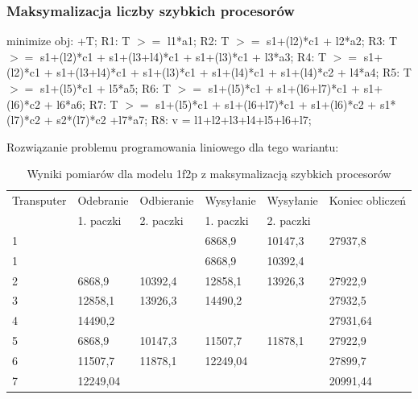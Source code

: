 \documentclass[a4paper,11pt, titlepage]{article}
\begin{document}
\subsubsection{Maksymalizacja liczby szybkich procesorów}
\begin{flushleft}

minimize obj: +T;\linebreak
\linebreak
R1: T $>=$ l1*a1;\linebreak
R2: T $>=$ s1+(l2)*c1 + l2*a2;\linebreak
R3: T $>=$ s1+(l2)*c1 + s1+(l3+l4)*c1 + s1+(l3)*c1 + l3*a3;\linebreak
R4: T $>=$ s1+(l2)*c1 + s1+(l3+l4)*c1 + s1+(l3)*c1 + s1+(l4)*c1 + s1+(l4)*c2 + l4*a4;\linebreak
R5: T $>=$ s1+(l5)*c1 + l5*a5;\linebreak
R6: T $>=$ s1+(l5)*c1 + s1+(l6+l7)*c1 + s1+(l6)*c2 + l6*a6;\linebreak
R7: T $>=$ s1+(l5)*c1 + s1+(l6+l7)*c1 + s1+(l6)*c2 + s1*(l7)*c2 + s2*(l7)*c2 +l7*a7;\linebreak
R8: v = l1+l2+l3+l4+l5+l6+l7;\linebreak
\end{flushleft}

Rozwiązanie problemu programowania liniowego dla tego wariantu:
\begin{table}[hp!]
\begin{tabular}{|l|l|l|l|l|l|}\hline
Transputer&Odebranie&Odbieranie&Wysyłanie&Wysyłanie&Koniec obliczeń\\
&1. paczki&2. paczki&1. paczki&2. paczki&\\ \hline
1	&			&			&6868,9		&10147,3	&27937,8\\ \hline
1	&			&			&6868,9		&10392,4	&\\ \hline
2	&6868,9		&10392,4	&12858,1	&13926,3	&27922,9\\ \hline
3	&12858,1	&13926,3	&14490,2	&			&27932,5\\ \hline
4	&14490,2	&			&			&			&27931,64\\ \hline
5	&6868,9		&10147,3	&11507,7	&11878,1	&27922,9\\ \hline
6	&11507,7	&11878,1	&12249,04	&			&27899,7\\ \hline
7	&12249,04	&			&			&			&20991,44\\ \hline

\end{tabular}
\caption{Wyniki pomiarów dla modelu 1f2p z maksymalizacją szybkich procesorów \label{1f2p_pt}}
\end{table}
\end{document}
